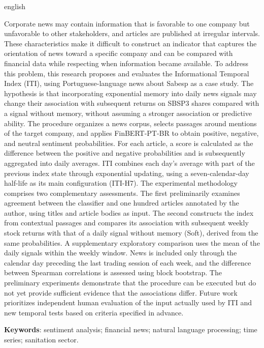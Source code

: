 \begin{resumo}[Abstract]
\begin{otherlanguage*}{english}

Corporate news may contain information that is favorable to one company but unfavorable to other stakeholders, and articles are published at irregular intervals. These characteristics make it difficult to construct an indicator that captures the orientation of news toward a specific company and can be compared with financial data while respecting when information became available. To address this problem, this research proposes and evaluates the Informational Temporal Index (ITI), using Portuguese-language news about Sabesp as a case study. The hypothesis is that incorporating exponential memory into daily news signals may change their association with subsequent returns on SBSP3 shares compared with a signal without memory, without assuming a stronger association or predictive ability. The procedure organizes a news corpus, selects passages around mentions of the target company, and applies FinBERT-PT-BR to obtain positive, negative, and neutral sentiment probabilities. For each article, a score is calculated as the difference between the positive and negative probabilities and is subsequently aggregated into daily averages. ITI combines each day's average with part of the previous index state through exponential updating, using a seven-calendar-day half-life as its main configuration (ITI-H7). The experimental methodology comprises two complementary assessments. The first preliminarily examines agreement between the classifier and one hundred articles annotated by the author, using titles and article bodies as input. The second constructs the index from contextual passages and compares its association with subsequent weekly stock returns with that of a daily signal without memory (Soft), derived from the same probabilities. A supplementary exploratory comparison uses the mean of the daily signals within the weekly window. News is included only through the calendar day preceding the last trading session of each week, and the difference between Spearman correlations is assessed using block bootstrap. The preliminary experiments demonstrate that the procedure can be executed but do not yet provide sufficient evidence that the associations differ. Future work prioritizes independent human evaluation of the input actually used by ITI and new temporal tests based on criteria specified in advance.

\vspace{\onelineskip}

\noindent
\textbf{Keywords}: sentiment analysis; financial news; natural language processing; time series; sanitation sector.
\end{otherlanguage*}
\end{resumo}

